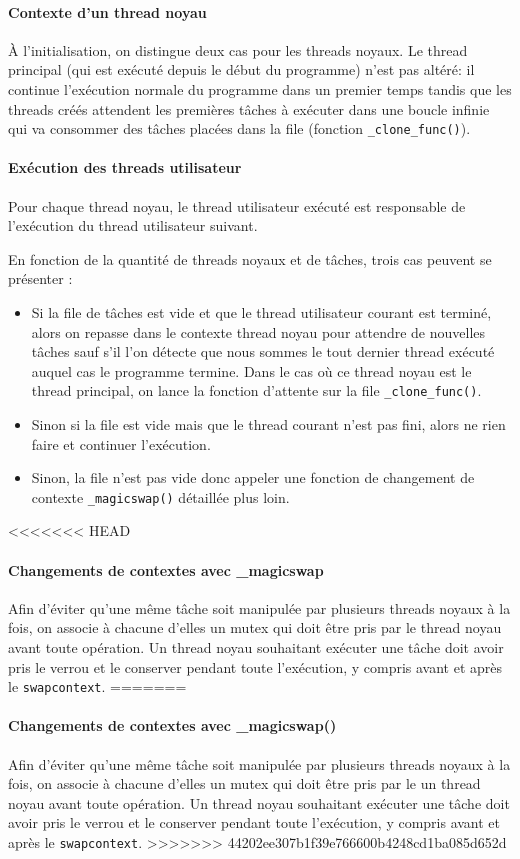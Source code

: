 \paragraph{Contexte d'un thread noyau} À l'initialisation, on distingue deux cas pour les threads noyaux. Le thread principal (qui est exécuté depuis le début du programme) n'est pas altéré: il continue l'exécution normale du programme dans un premier temps tandis que les threads créés attendent les premières tâches à exécuter dans une boucle infinie qui va consommer des tâches placées dans la file (fonction \verb!_clone_func()!).

\paragraph{Exécution des threads utilisateur} Pour chaque thread noyau, le thread utilisateur exécuté est responsable de l'exécution du thread utilisateur suivant. 

En fonction de la quantité de threads noyaux et de tâches, trois cas peuvent se présenter :
\begin{itemize}
	\item Si la file de tâches est vide et que le thread utilisateur courant est terminé, alors on repasse dans le contexte thread noyau pour attendre de nouvelles tâches sauf s'il l'on détecte que nous sommes le tout dernier thread exécuté auquel cas le programme termine. Dans le cas où ce thread noyau est le thread principal, on lance la fonction d'attente sur la file \verb!_clone_func()!.
	\item Sinon si la file est vide mais que le thread courant n'est pas fini, alors ne rien faire et continuer l'exécution.
	\item Sinon, la file n'est pas vide donc appeler une fonction de changement de contexte \verb!_magicswap()! détaillée plus loin.
\end{itemize}

<<<<<<< HEAD
\paragraph{Changements de contextes avec \_magicswap} Afin d'éviter qu'une même tâche soit manipulée par plusieurs threads noyaux à la fois, on associe à chacune d'elles un mutex qui doit être pris par le thread noyau avant toute opération. Un thread noyau souhaitant exécuter une tâche doit avoir pris le verrou et le conserver pendant toute l'exécution, y compris avant et après le \verb!swapcontext!.
=======
\paragraph{Changements de contextes avec \_magicswap()} Afin d'éviter qu'une même tâche soit manipulée par plusieurs threads noyaux à la fois, on associe à chacune d'elles un mutex qui doit être pris par le un thread noyau avant toute opération. Un thread noyau souhaitant exécuter une tâche doit avoir pris le verrou et le conserver pendant toute l'exécution, y compris avant et après le \verb!swapcontext!.
>>>>>>> 44202ee307b1f39e766600b4248cd1ba085d652d

